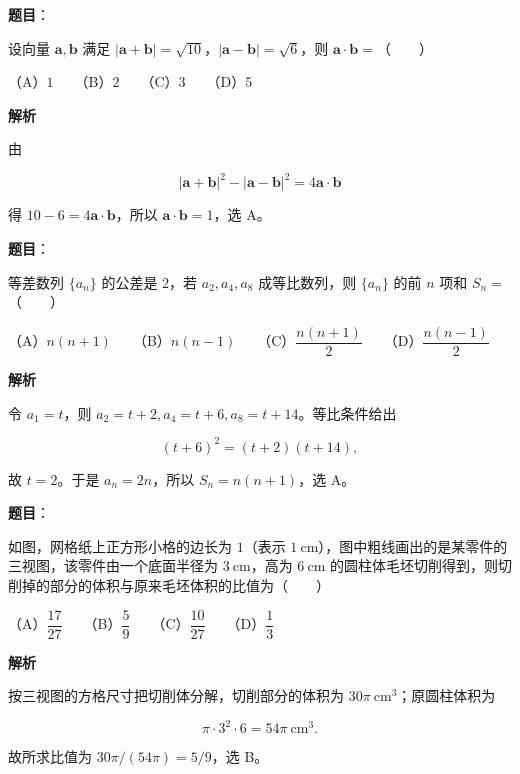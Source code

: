\begin{answer}

\textbf{题目}：

设向量 $\boldsymbol a,\boldsymbol b$ 满足 $|\boldsymbol a+\boldsymbol b|=\sqrt{10}$，$|\boldsymbol a-\boldsymbol b|=\sqrt6$，则 $\boldsymbol a\cdot\boldsymbol b=$\mbox{（　　）}

（A）$1$　　（B）$2$　　（C）$3$　　（D）$5$

\textbf{解析}

由

\nopagebreak[4]
\[
|\boldsymbol a+\boldsymbol b|^2-|\boldsymbol a-\boldsymbol b|^2=4\boldsymbol a\cdot\boldsymbol b
\]

得 $10-6=4\boldsymbol a\cdot\boldsymbol b$，所以 $\boldsymbol a\cdot\boldsymbol b=1$，选 A。


\end{answer}
\begin{answer}

\textbf{题目}：

等差数列 $\{a_n\}$ 的公差是 $2$，若 $a_2,a_4,a_8$ 成等比数列，则 $\{a_n\}$ 的前 $n$ 项和 $S_n=$\mbox{（　　）}

（A）$n(n+1)$　　（B）$n(n-1)$　　（C）$\dfrac{n(n+1)}2$　　（D）$\dfrac{n(n-1)}2$

\textbf{解析}

令 $a_1=t$，则 $a_2=t+2,a_4=t+6,a_8=t+14$。等比条件给出

\nopagebreak[4]
\[
(t+6)^2=(t+2)(t+14),
\]

故 $t=2$。于是 $a_n=2n$，所以 $S_n=n(n+1)$，选 A。


\end{answer}
\begin{answer}

\textbf{题目}：

如图，网格纸上正方形小格的边长为 $1$（表示 $1\ \mathrm{cm}$），图中粗线画出的是某零件的三视图，该零件由一个底面半径为 $3\ \mathrm{cm}$，高为 $6\ \mathrm{cm}$ 的圆柱体毛坯切削得到，则切削掉的部分的体积与原来毛坯体积的比值为\mbox{（　　）}
\nopagebreak[4]
\begin{center}\end{center}
\nopagebreak[4]
（A）$\dfrac{17}{27}$　　（B）$\dfrac59$　　（C）$\dfrac{10}{27}$　　（D）$\dfrac13$

\textbf{解析}

按三视图的方格尺寸把切削体分解，切削部分的体积为 $30\pi\ \mathrm{cm}^3$；原圆柱体积为

\nopagebreak[4]
\[
\pi\cdot3^2\cdot6=54\pi\ \mathrm{cm}^3.
\]

故所求比值为 $30\pi/(54\pi)=5/9$，选 B。


\end{answer}
